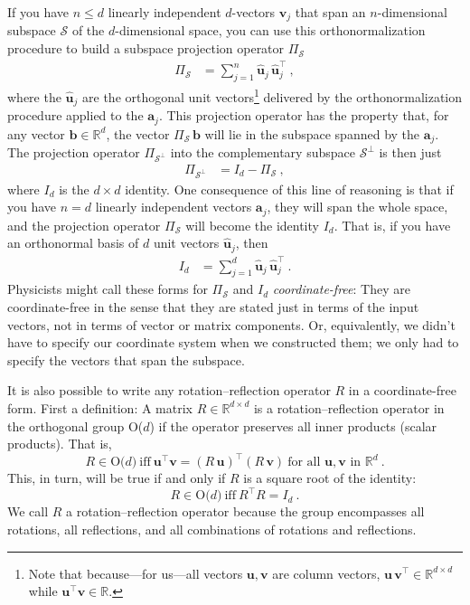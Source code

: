 \documentclass{article}
\newcommand{\proj}{\mathsf{\Pi}}
\newcommand{\Evec}[1]{{\mathbf{#1}}} %
\newcommand{\Ehat}[1]{{\mathbf{\hat{#1}}}} %
\begin{document}
If you have $n\leq d$ linearly independent $d$-vectors $\Evec{v}_j$ that span an $n$-dimensional subspace $\mathscr{S}$ of the $d$-dimensional space, you can use this orthonormalization procedure to build a subspace projection operator $\proj_\mathscr{S}$
\begin{align}\label{eq:oproj}
    \proj_\mathscr{S} &= \sum_{j=1}^n \Ehat{u}_j\,\Ehat{u}_j^\top ~,
\end{align}
where the $\Ehat{u}_j$ are the orthogonal unit vectors\footnote{Note that because---for us---all vectors $\Evec{u},\Evec{v}$ are column vectors, $\Evec{u}\,\Evec{v}^\top\in\mathbb{R}^{d\times d}$ while $\Evec{u}^\top \Evec{v}\in\mathbb{R}$.} delivered by the orthonormalization procedure applied to the $\Evec{a}_j$.
This projection operator has the property that, for any vector $\Evec{b}\in\mathbb{R}^d$, the vector $\proj_\mathscr{S}\,\Evec{b}$ will lie in the subspace spanned by the $\Evec{a}_j$.
The projection operator $\proj_{\mathscr{S}^\perp}$ into the complementary subspace $\mathscr{S}^\perp$ is then just
\begin{align}\label{eq:oprojcomp}
    \proj_{\mathscr{S}^\perp} &= I_d - \proj_\mathscr{S} ~,
\end{align}
where $I_d$ is the $d\times d$ identity.
One consequence of this line of reasoning is that if you have $n=d$ linearly independent vectors $\Evec{a}_j$, they will span the whole space, and the projection operator $\proj_\mathscr{S}$ will become the identity $I_d$.
That is, if you have an orthonormal basis of $d$ unit vectors $\Ehat{u}_j$, then
\begin{align}\label{eq:oI}
    I_d &= \sum_{j=1}^d \Ehat{u}_j\,\Ehat{u}_j^\top ~.
\end{align}
Physicists might call these forms for $\proj_\mathscr{S}$ and $I_d$ \emph{coordinate-free}:
They are coordinate-free in the sense that they are stated just in terms of the input vectors, not in terms of vector or matrix components.
Or, equivalently, we didn't have to specify our coordinate system when we constructed them; we only had to specify the vectors that span the subspace.

It is also possible to write any rotation--reflection operator $R$ in a coordinate-free form.
First a definition: A matrix $R\in\mathbb{R}^{d\times d}$ is a rotation--reflection operator in the orthogonal group O($d$) if the operator preserves all inner products (scalar products).
That is,
\begin{equation}
    R \in \mbox{O($d$)} ~ \mbox{iff} ~ \Evec{u}^\top\Evec{v}=(R\,\Evec{u})^\top(R\,\Evec{v}) ~ \mbox{for all $\Evec{u},\Evec{v}$ in $\mathbb{R}^d$} ~.\label{eq:orth1}
\end{equation}
This, in turn, will be true if and only if $R$ is a square root of the identity:
\begin{equation}
    R \in \mbox{O($d$)} ~ \mbox{iff} ~ R^\top R=I_d ~.\label{eq:orth2}
\end{equation}
We call $R$ a rotation--reflection operator because the group encompasses all rotations, all reflections, and all combinations of rotations and reflections.
\end{document}
